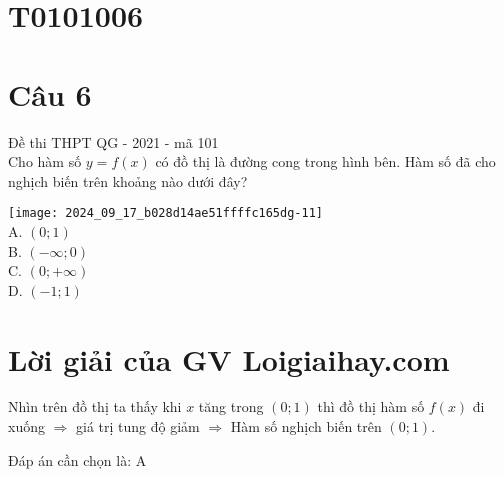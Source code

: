 \section*{T0101006}
\section*{Câu 6}
Đề thi THPT QG - 2021 - mã 101\\
Cho hàm số $y=f(x)$ có đồ thị là đường cong trong hình bên. Hàm số đã cho nghịch biến trên khoảng nào dưới đây?

\texttt{[image: 2024\_09\_17\_b028d14ae51ffffc165dg-11]}\\
A. $(0 ; 1)$\\
B. $(-\infty ; 0)$\\
C. $(0 ;+\infty)$\\
D. $(-1 ; 1)$

\section*{Lời giải của GV Loigiaihay.com}
Nhìn trên đồ thị ta thấy khi $x$ tăng trong $(0 ; 1)$ thì đồ thị hàm số $f(x)$ đi xuống $\Rightarrow$ giá trị tung độ giảm $\Rightarrow$ Hàm số nghịch biến trên $(0 ; 1)$.

Đáp án cần chọn là: A